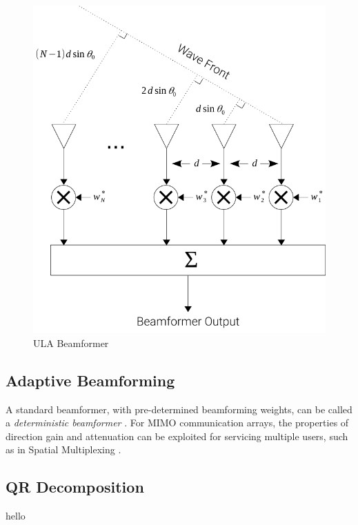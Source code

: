 \begin{figure}[!htbp]
  \centering
  \includegraphics[]{02_abf_background/ula_beamformer}
  \caption{ULA Beamformer}
  \label{fig:ula_beamformer}
\end{figure}








\subsection{Adaptive Beamforming}

A standard beamformer, with pre-determined beamforming weights, can be called a \emph{deterministic beamformer} \citep{6206403}. For MIMO communication arrays, the properties of direction gain and attenuation can be exploited for servicing multiple users, such as in Spatial Multiplexing \citep{6732923}.









\subsection{QR Decomposition}

hello \citep{AN506}


